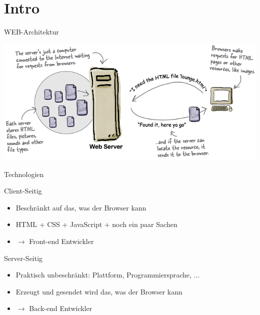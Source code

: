 \section{Intro}

\begin{definition}{WEB-Architektur}
    
    \includegraphics[width=1\linewidth]{images/web_architektur.png}
\end{definition}

\begin{concept}{Technologien}
    
    Client-Seitig
    \begin{itemize}
        \item Beschränkt auf das, was der Browser kann
        \item HTML + CSS + JavaScript + noch ein paar Sachen
        \item $\rightarrow$ Front-end Entwickler
    \end{itemize}

    Server-Seitig
    \begin{itemize}
        \item Praktisch unbeschränkt: Plattform, Programmiersprache, ...
        \item Erzeugt und gesendet wird das, was der Browser kann
        \item $\rightarrow$ Back-end Entwickler
    \end{itemize}
\end{concept}